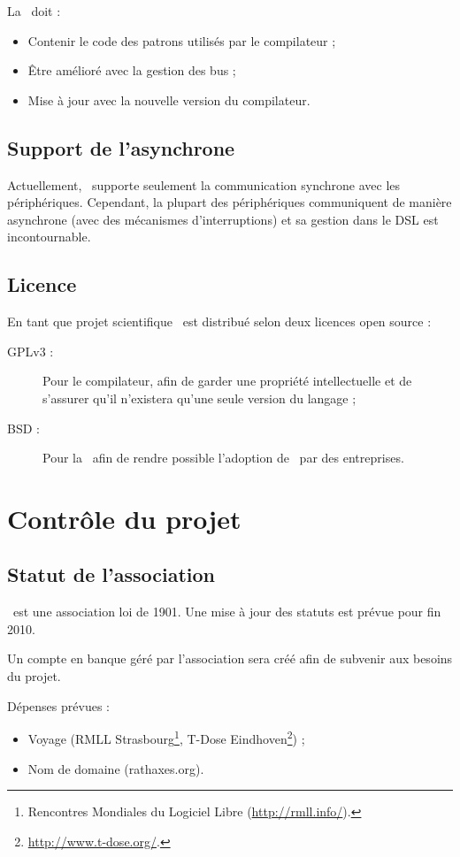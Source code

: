 \documentclass[chapterprefix=off]{rtxreport}
\begin{document}
La \BL\ doit :
\begin{itemize}
\item Contenir le code des patrons utilisés par le compilateur ;
\item Être amélioré avec la gestion des bus ;
\item Mise \`a jour avec la nouvelle version du compilateur.
\end{itemize}

\section{Support de l'asynchrone}

Actuellement, \rtx\ supporte seulement la communication synchrone avec les
périphériques. Cependant, la plupart des périphériques communiquent de manière
asynchrone (avec des mécanismes d'interruptions) et sa gestion dans le DSL est
incontournable.

\section{Licence}

En tant que projet scientifique \rtx\ est distribué selon deux licences open
source :
\begin{description}
\item[GPLv3 :] Pour le compilateur, afin de garder une propriété intellectuelle
et de s'assurer qu'il n'existera qu'une seule version du langage ;
\item[BSD :] Pour la \BL\ afin de rendre possible l'adoption de \rtx\ par des
entreprises.
\end{description}

\chapter{Contrôle du projet}

\section{Statut de l'association}

\rtx\ est une association loi de 1901. Une mise à jour des statuts est
prévue pour fin 2010.

Un compte en banque géré par l'association sera créé afin de subvenir aux
besoins du projet.

Dépenses prévues :
\begin{itemize}
\item Voyage (RMLL Strasbourg\footnote{Rencontres Mondiales du Logiciel
Libre (\url{http://rmll.info/}).}, T-Dose
Eindhoven\footnote{\url{http://www.t-dose.org/}.}) ;
\item Nom de domaine (rathaxes.org).
\end{itemize}
\end{document}
